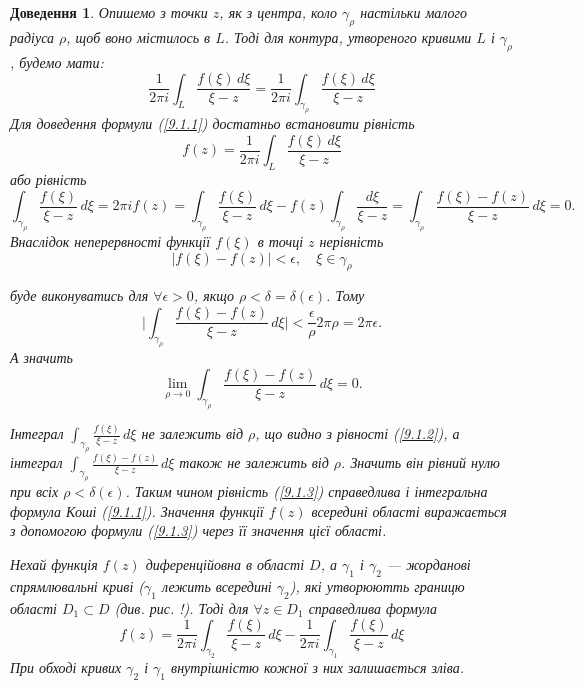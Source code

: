 \documentclass[12pt,fleqn]{article}
\theoremstyle{theorem}
\theoremstyle{proof}
\newtheorem*{dov}{Доведення}
\numberwithin{figure}{section}
\numberwithin{equation}{section}
\begin{document}
\begin{dov}
Опишемо з точки $z$, як з центра, коло $\gamma_\rho$ настільки малого радіуса $\rho$, щоб воно містилось в $L$. Тоді для контура, утвореного кривими $L$ і $\gamma_\rho$, будемо мати:
\begin{equation}\label{9.1.2}
\frac{1}{2\pi i}\int_{L}\frac{f(\xi)\,d\xi}{\xi-z} = \frac{1}{2\pi i}\int_{\gamma_\rho} \frac{f(\xi)\,d\xi}{\xi-z}
\end{equation}
Для доведення формули (\ref{9.1.1}) достатньо встановити рівність
\[ f(z)= \frac{1}{2\pi i} \int_{L}\frac{f(\xi)\,d\xi}{\xi-z} \]
або рівність
\begin{equation}\label{9.1.3}
\int_{\gamma_\rho}\frac{f(\xi)}{\xi-z}\,d\xi=2\pi if(z) = \int_{\gamma_\rho}\frac{f(\xi)}{\xi-z}\,d\xi-f(z)\int_{\gamma_\rho}\frac{d\xi}{\xi-z}=\int_{\gamma_\rho}\frac{f(\xi)-f(z)}{\xi-z}\,d\xi=0.
\end{equation}
Внаслідок неперервності функції $f(\xi)$ в точці $z$ нерівність
\[ |f(\xi)-f(z)|<\epsilon, \quad \xi\in\gamma_\rho \]

буде виконуватись для $\forall\epsilon>0$, якщо $\rho<\delta=\delta(\epsilon)$. Тому
\[ \bigg| \int_{\gamma_\rho} \frac{f(\xi)-f(z)}{\xi-z}\,d\xi \bigg|< \frac{\epsilon}{\rho} 2\pi\rho=2\pi\epsilon. \]
А значить
\[ \lim_{\rho \to 0} \int_{\gamma_\rho} \frac{f(\xi)-f(z)}{\xi-z}\,d\xi=0. \]

Інтеграл $\int_{\gamma_\rho} \frac{f(\xi)}{\xi - z}\,d\xi$ не залежить від $\rho$, що видно з рівності (\ref{9.1.2}), а інтеграл $\int_{\gamma_\rho} \frac{f(\xi)-f(z)}{\xi - z}\,d\xi$ також не залежить від $\rho$. Значить він рівний нулю при всіх $\rho < \delta(\epsilon)$. Таким чином рівність (\ref{9.1.3}) справедлива і інтегральна формула Коші (\ref{9.1.1}).
Значення функції $f(z)$ всередині області виражається з допомогою формули (\ref{9.1.3}) через її значення цієї області.

Нехай функція $f(z)$ диференційовна в області $D$, а $\gamma_1$ і $\gamma_2$ --- жорданові спрямлювальні криві ($\gamma_1$ лежить всередині $\gamma_2$), які утворюютть границю області $D_1 \subset D$ (див. рис. !). Тоді для $\forall z \in D_1$ справедлива формула
\begin{equation}\label{9.1.4}
f(z)=\frac{1}{2\pi i}\int_{\gamma_2}\frac{f(\xi)}{\xi-z}\,d\xi-\frac{1}{2\pi i}\int_{\gamma_1}\frac{f(\xi)}{\xi-z}\,d\xi
\end{equation}
При обході кривих $\gamma_2$ і $\gamma_1$ внутрішністю кожної з них залишається зліва.
\end{dov}
\end{document}

